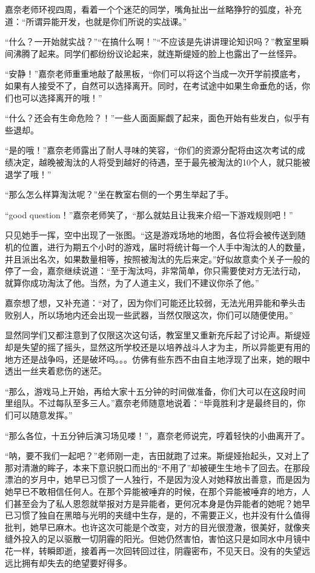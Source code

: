 \documentclass[a5paper, punct=kaiming, fontset=founder]{ctexart}
\begin{document}
嘉奈老师环视四周，看着一个个迷茫的同学，嘴角扯出一丝略狰狞的弧度，补充道：“所谓异能开发，也就是你们所说的实战课。”

“什么？一开始就实战？”“在搞什么啊！”“不应该是先讲讲理论知识吗？”教室里瞬间沸腾了起来。同学们都纷纷议论起来，就连斯缇娅的脸上也露出了一丝怪异。

“安静！”嘉奈老师重重地敲了敲黑板，“你们可以将这个当成一次开学前摸底考，如果有人接受不了，自然可以选择离开。同时，在考试途中如果生命垂危的话，你们也可以选择离开的哦！”

“什么？还会有生命危险？！”一些人面面厮觑了起来，面色开始有些发白，似乎有些退却。

“是的哦！”嘉奈老师露出了耐人寻味的笑容，“你们的资源分配将由这次考试的成绩决定，越晚被淘汰的人将受到越好的待遇，至于最先被淘汰的10个人，就只能被退学了哦！”

“那么怎么样算淘汰呢？”坐在教室右侧的一个男生举起了手。

“good question！”嘉奈老师笑了，“那么就姑且让我来介绍一下游戏规则吧！”

只见她手一挥，空中出现了一张图。“这是游戏场地的地图，各位将会被传送到随机的位置，进行为期五个小时的游戏，届时将统计每一个人手中淘汰的人的数量，并且派出名次，如果数量相等，按照被淘汰的先后来定。”好似故意卖个关子一般的停了一会，嘉奈继续说道：“至于淘汰吗，非常简单，你只需要使对方无法行动，就算你成功淘汰了他。当然，为了人道主义，我们不建议你杀了他。”

嘉奈想了想，又补充道：“对了，因为你们可能还比较弱，无法光用异能和拳头击败别人，所以场地内还会出现一些武器，当然仅限这次，你们可以随便使用。”

显然同学们又都注意到了仅限这次这句话，教室里又重新充斥起了讨论声。斯缇娅却是失望的摇了摇头，显然这所学校还是以培养战斗人才为主，所以异能更有用的地方还是战争吗，还是破坏吗。。。仿佛有些东西不由自主地浮现了出来，她的眼中透出一丝夹着悲伤的迷茫。

“那么，游戏马上开始，再给大家十五分钟的时间做准备，你们大可以在这段时间里组队。不过每队至多三人。”嘉奈老师随意地说着：“毕竟胜利才是最终目的，你们可以随意发挥。”

“那么各位，十五分钟后演习场见喽！”，嘉奈老师说完，哼着轻快的小曲离开了。

“呐，要不我们一起吧？”老师刚一走，吉田就跑了过来。斯缇娅抬起头，又对上了那对清澈的眸子，本来下意识脱口而出的“不用了”却被硬生生地卡了回去。在那段漂泊的岁月中，她早已习惯了一人独行，不是因为没人对她释放出善意，而是因为她早已不敢相信任何人。在那个异能被唾弃的时候，在那个异能被唾弃的地方，人们甚至会为了私人恩怨就举报对方是异能者，更何况本身是伪异能者的她呢？她早已习惯了独自在黑暗与光明的夹缝中生存，是的，不需要正义，也并没有什么值得批判，她早已麻木。也许这次可能是个改变，对方的目光很澄澈，很美好，就像夹缝外投入的足以驱散一切阴霾的阳光。但她仍然害怕，害怕这只是如同水中月镜中花一样，转瞬即逝，接着再一次回转回过往，阴霾密布，不见天日。没有的失望远远比拥有却失去的绝望要好得多。
\end{document}
